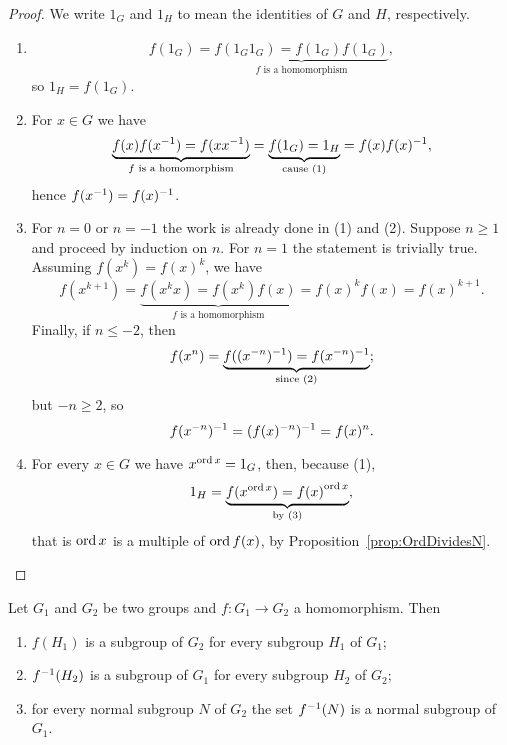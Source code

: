 \begin{proof}
We write \(1_G\) and \(1_H\) to mean the identities of \(G\) and \(H\), respectively.
\begin{enumerate}
\item \[f(1_G) = \underbrace{f(1_G 1_G) = f(1_G) f(1_G)}_{f \text{ is a homomorphism}},\]
so \(1_H = f(1_G)\).
\item For \(x \in G\) we have 
\[\underbrace{f(x) f(x^{-1}) = f (x x^{-1})}_{f \text{ is a homomorphism}} = \underbrace{f(1_G) = 1_H}_{\text{cause (1)}} = f(x) f(x)^{-1},\]
hence \(f(x^{-1}) = f(x)^{-1}\).
\item For \(n = 0\) or \(n = -1\) the work is already done in (1) and (2). Suppose \(n \ge 1\) and proceed by induction on \(n\). For \(n = 1\) the statement is trivially true. Assuming \(f(x^k) = f(x)^k\), we have
\[f(x^{k+1}) = \underbrace{f(x^kx) = f(x^k)f(x)}_{f \text{ is a homomorphism}} = f(x)^kf(x) = f(x)^{k+1}.\]
Finally, if \(n \le -2\), then
\[f(x^n) = \underbrace{f((x^{-n})^{-1}) = f(x^{-n})^{-1}}_{\text{since (2)}};\]
but \(-n \ge 2\), so
\[f(x^{-n})^{-1} = (f(x)^{-n})^{-1} = f(x)^n .\]
\item For every \(x \in G\) we have \(x^{\operatorname{ord} x} = 1_G\), then, because (1),
\[1_H = \underbrace{f(x^{\operatorname{ord} x}) = {f(x)}^{\operatorname{ord} x}}_{\text{by (3)}},\]
that is \(\operatorname{ord} x\) is a multiple of \(\operatorname{ord} f(x)\), by Proposition~\ref{prop:OrdDividesN}. \qedhere
\end{enumerate}
\end{proof}

\begin{proposition}\label{prop:SubgroupsToSubgroups}
Let \(G_1\) and \(G_2\) be two groups and \(f : G_1 \to G_2\) a homomorphism. Then
\begin{enumerate}
\item \(f(H_1)\) is a subgroup of \(G_2\) for every subgroup \(H_1\) of \(G_1\);
\item \(f^{-1}(H_2)\) is a subgroup of \(G_1\) for every subgroup \(H_2\) of \(G_2\);
\item for every normal subgroup \(N\) of \(G_2\) the set \(f^{-1} (N)\) is a normal subgroup of \(G_1\).
\end{enumerate}
\end{proposition}

